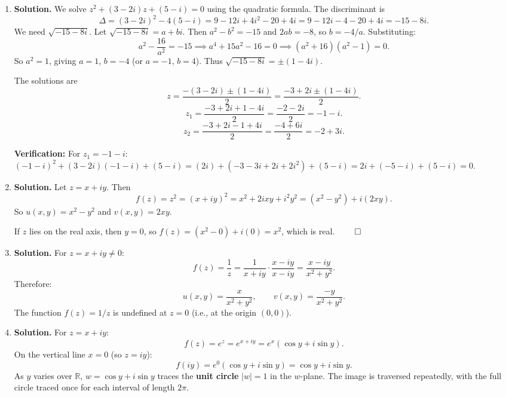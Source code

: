 \begin{enumerate}
$k=0$: $z_0 = 2e^{i\pi/4} = 2\left(\frac{\sqrt{2}}{2} + i\frac{\sqrt{2}}{2}\right) = \sqrt{2} + i\sqrt{2}.$

$k=1$: $z_1 = 2e^{i3\pi/4} = 2\left(-\frac{\sqrt{2}}{2} + i\frac{\sqrt{2}}{2}\right) = -\sqrt{2} + i\sqrt{2}.$

$k=2$: $z_2 = 2e^{i5\pi/4} = 2\left(-\frac{\sqrt{2}}{2} - i\frac{\sqrt{2}}{2}\right) = -\sqrt{2} - i\sqrt{2}.$

$k=3$: $z_3 = 2e^{i7\pi/4} = 2\left(\frac{\sqrt{2}}{2} - i\frac{\sqrt{2}}{2}\right) = \sqrt{2} - i\sqrt{2}.$

\item \textbf{Solution.}
We solve $z^2 + (3 - 2i)z + (5 - i) = 0$ using the quadratic formula. The discriminant is
\[
\Delta = (3 - 2i)^2 - 4(5 - i) = 9 - 12i + 4i^2 - 20 + 4i = 9 - 12i - 4 - 20 + 4i = -15 - 8i.
\]
We need $\sqrt{-15 - 8i}$. Let $\sqrt{-15 - 8i} = a + bi$. Then $a^2 - b^2 = -15$ and $2ab = -8$, so $b = -4/a$. Substituting:
\[
a^2 - \frac{16}{a^2} = -15 \implies a^4 + 15a^2 - 16 = 0 \implies (a^2 + 16)(a^2 - 1) = 0.
\]
So $a^2 = 1$, giving $a = 1$, $b = -4$ (or $a = -1$, $b = 4$). Thus $\sqrt{-15 - 8i} = \pm(1 - 4i)$.

The solutions are
\[
z = \frac{-(3 - 2i) \pm (1 - 4i)}{2} = \frac{-3 + 2i \pm (1 - 4i)}{2}.
\]
\[
z_1 = \frac{-3 + 2i + 1 - 4i}{2} = \frac{-2 - 2i}{2} = -1 - i.
\]
\[
z_2 = \frac{-3 + 2i - 1 + 4i}{2} = \frac{-4 + 6i}{2} = -2 + 3i.
\]

\textbf{Verification:} For $z_1 = -1 - i$: $(-1 - i)^2 + (3 - 2i)(-1 - i) + (5 - i) = (2i) + (-3 - 3i + 2i + 2i^2) + (5 - i) = 2i + (-5 - i) + (5 - i) = 0.$
\item \textbf{Solution.}
Let $z = x + iy$. Then
\[
f(z) = z^2 = (x + iy)^2 = x^2 + 2ixy + i^2 y^2 = (x^2 - y^2) + i(2xy).
\]
So $u(x,y) = x^2 - y^2$ and $v(x,y) = 2xy$.

If $z$ lies on the real axis, then $y = 0$, so $f(z) = (x^2 - 0) + i(0) = x^2$, which is real. $\qed$

\item \textbf{Solution.}
For $z = x + iy \neq 0$:
\[
f(z) = \frac{1}{z} = \frac{1}{x + iy} \cdot \frac{x - iy}{x - iy} = \frac{x - iy}{x^2 + y^2}.
\]
Therefore:
\[
u(x,y) = \frac{x}{x^2 + y^2}, \qquad v(x,y) = \frac{-y}{x^2 + y^2}.
\]
The function $f(z) = 1/z$ is undefined at $z = 0$ (i.e., at the origin $(0,0)$).

\item \textbf{Solution.}
For $z = x + iy$:
\[
f(z) = e^z = e^{x+iy} = e^x(\cos y + i\sin y).
\]
On the vertical line $x = 0$ (so $z = iy$):
\[
f(iy) = e^0(\cos y + i\sin y) = \cos y + i\sin y.
\]
As $y$ varies over $\mathbb{R}$, $w = \cos y + i\sin y$ traces the \textbf{unit circle} $|w| = 1$ in the $w$-plane. The image is traversed repeatedly, with the full circle traced once for each interval of length $2\pi$.


\end{enumerate}
